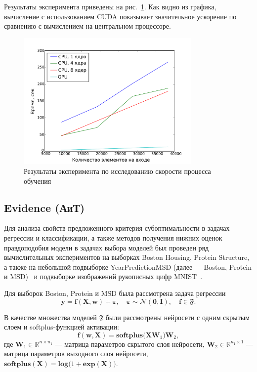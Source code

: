Результаты эксперимента приведены на рис.~\ref{fig:speed}. Как видно из графика, вычисление с использованием CUDA показывает значительное ускорение по сравнению с вычислением на центральном процессоре.

\begin{figure}[tb!]
 \centering
  \includegraphics[width=0.8\textwidth]{plots/popova/result.pdf}
 \caption{Результаты эксперимента по исследованию скорости процесса обучения}
 \label{fig:speed}
\end{figure}



\subsection{Evidence (АиТ)}
Для анализа свойств предложенного критерия субоптимальности в задачах регрессии и классификации, а также методов получения нижних оценок правдоподобия модели в задачах выбора моделей был проведен ряд вычислительных экспериментов на выборках Boston Housing, Protein Structure, а также на небольшой подвыборке YearPredictionMSD (далее --- Boston, Protein и MSD)~\cite{UCI} {и подвыборке изображений рукописных цифр MNIST~\cite{mnist}}.

{Для выборок Boston, Protein и MSD} была рассмотрена задача регрессии
\[
	\mathbf{y} = \mathbf{f}(\mathbf{X}, \mathbf{w}) + \boldsymbol{\varepsilon}, \quad  \boldsymbol{\varepsilon} \sim \mathcal{N}(\mathbf{0}, \mathbf{I}), \quad \mathbf{f} \in \mathfrak{F}.
\]

В качестве множества моделей $\mathfrak{F}$ были рассмотрены  нейросети с одним скрытым слоем и softplus-функцией активации:
\begin{equation}
\label{eq:model}
	\mathbf{f}(\mathbf{w}, \mathbf{X}) =   \textbf{softplus}\bigl(\mathbf{X} \mathbf{W}_1 \bigr)  \mathbf{W}_2,
\end{equation}
где $\mathbf{W}_1 \in \mathbb{R}^{n\times n_1}$ --- матрица параметров скрытого слоя нейросети, $\mathbf{W}_2 \in \mathbb{R}^{n_1\times 1}$ --- матрица параметров выходного слоя нейросети, {$\textbf{softplus}(\mathbf{X}) = \textbf{log}\bigl(1+\textbf{exp}(\mathbf{X})\bigr)$}.

